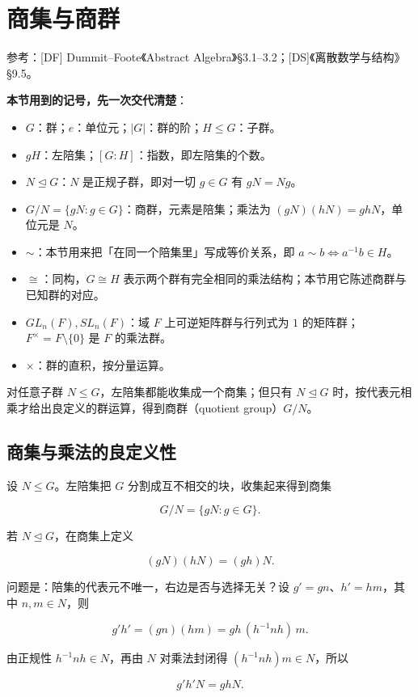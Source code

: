\section{商集与商群}


参考：[DF] Dummit–Foote《Abstract Algebra》§3.1–3.2；[DS]《离散数学与结构》§9.5。

\textbf{本节用到的记号，先一次交代清楚}：

\begin{itemize}
\item $G$：群；$e$：单位元；$|G|$：群的阶；$H\le G$：子群。
\item $gH$：左陪集；$[G:H]$：指数，即左陪集的个数。
\item $N\trianglelefteq G$：$N$ 是正规子群，即对一切 $g\in G$ 有 $gN=Ng$。
\item $G/N=\{gN:g\in G\}$：商群，元素是陪集；乘法为 $(gN)(hN)=ghN$，单位元是 $N$。
\item $\sim$：本节用来把「在同一个陪集里」写成等价关系，即 $a\sim b\iff a^{-1}b\in H$。
\item $\cong$：同构，$G\cong H$ 表示两个群有完全相同的乘法结构；本节用它陈述商群与已知群的对应。
\item $GL_n(F),SL_n(F)$：域 $F$ 上可逆矩阵群与行列式为 $1$ 的矩阵群；$F^\times=F\setminus\{0\}$ 是 $F$ 的乘法群。
\item $\times$：群的直积，按分量运算。
\end{itemize}


对任意子群 $N\le G$，左陪集都能收集成一个商集；但只有 $N\trianglelefteq G$ 时，按代表元相乘才给出良定义的群运算，得到商群（quotient group）$G/N$。

\subsection{商集与乘法的良定义性}


设 $N\le G$。左陪集把 $G$ 分割成互不相交的块，收集起来得到商集

\[G/N=\{gN:g\in G\}.\]

若 $N\trianglelefteq G$，在商集上定义

\[(gN)(hN)=(gh)N.\]

问题是：陪集的代表元不唯一，右边是否与选择无关？设 $g'=gn$、$h'=hm$，其中 $n,m\in N$，则

\[g'h'=(gn)(hm)=gh\,(h^{-1}nh)\,m.\]

由正规性 $h^{-1}nh\in N$，再由 $N$ 对乘法封闭得 $(h^{-1}nh)m\in N$，所以

\[g'h'N=ghN.\]

